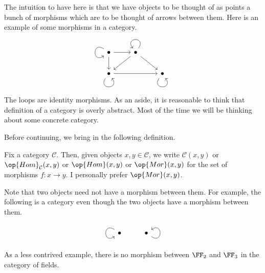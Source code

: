\documentclass[../notes.tex]{subfiles}
\begin{document}
The intuition to have here is that we have objects to be thought of as points a bunch of morphisms which are to be thought of arrows between them. Here is an example of some morphisms in a category.
\[\begin{tikzcd}
	\bullet \arrow[d] \arrow[r] \arrow[loop, distance=2em, in=215, out=145] & \bullet \arrow[ld] \arrow[rd] \arrow[loop, distance=2em, in=125, out=55] &                                                     \\
	\bullet \arrow[rr] \arrow[loop, distance=2em, in=305, out=235]          &                                                                          & \bullet \arrow[loop, distance=2em, in=305, out=235]
\end{tikzcd}\]
The loops are identity morphisms. As an aside, it is reasonable to think that definition of a category is overly abstract. Most of the time we will be thinking about some concrete category.

Before continuing, we bring in the following definition.
\begin{definition}
	Fix a category $\mathcal C$. Then, given objects $x,y\in\mathcal C$, we write $\mathcal C(x,y)$ or $\op{Hom}_\mathcal C(x,y)$ or $\op{Hom}(x,y)$ or $\op{Mor}(x,y)$ for the set of morphisms $f:x\to y$. I personally prefer $\op{Mor}(x,y)$.
\end{definition}
\noindent Note that two objects need not have a morphism between them. For example, the following is a category even though the two objects have a morphism between them.
\[\begin{tikzcd}
	\bullet \arrow[loop, distance=2em, in=215, out=145] & \bullet \arrow[loop, distance=2em, in=35, out=325]
\end{tikzcd}\]
As a less contrived example, there is no morphism between $\FF_2$ and $\FF_3$ in the category of fields.
\end{document}
